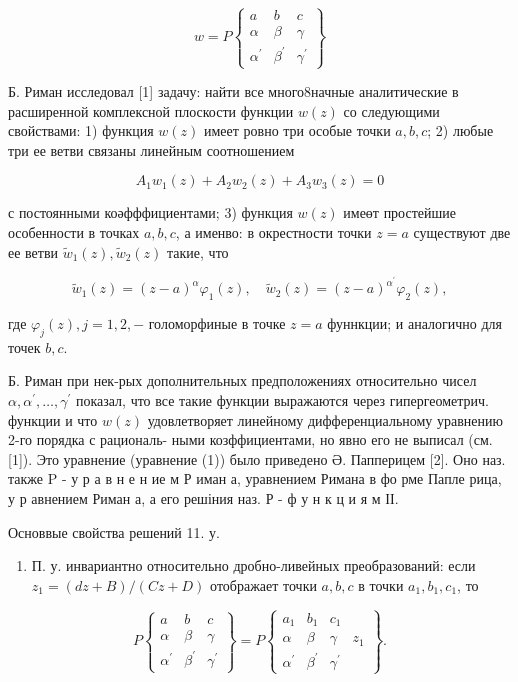 \documentclass[10pt]{article}
\begin{document}
\[
w=P\left\{\begin{array}{lll}
a & b & c \\
\alpha & \beta & \gamma \\
\alpha^{\prime} & \beta^{\prime} & \gamma^{\prime}
\end{array}\right\}
\]

Б. Риман исследовал [1] задачу: найти все много8начные аналитические в расширенной комплексной плоскости функции $w(z)$ со следующими свойствами: 1) функция $w(z)$ имеет ровно три особые точки $a, b, c$; 2) любые три ее ветви связаны линейным соотношением

\[
A_{1} w_{1}(z)+A_{2} w_{2}(z)+A_{3} w_{3}(z)=0
\]

с постоянными коәфффициентами; 3) функция $w(z)$ имеөт простейшие особенности в точках $a, b, c$, а именво: в окрестности точки $z=a$ существуют две ее ветви $\tilde{w}_{1}(z), \tilde{w}_{2}(z)$ такие, что

\[
\tilde{w}_{1}(z)=(z-a)^{\alpha} \varphi_{1}(z), \quad \tilde{w}_{2}(z)=(z-a)^{\alpha^{\prime}} \varphi_{2}(z),
\]

где $\varphi_{j}(z), j=1,2,-$ голоморфиные в точке $z=a$ фуннкции; и аналогично для точек $b, c$.

Б. Риман при нек-рых дополнительных предположениях относительно чисел $\alpha, \alpha^{\prime}, \ldots, \gamma^{\prime}$ показал, что все такие функции выражаются через гипергеометрич. функции и что $w(z)$ удовлетворяет линейному дифференциальному уравнению 2-го порядка с рациональ- ными козффициентами, но явно его не выписал (см. [1]). Это уравнение (уравнение (1)) было приведено Ə. Папперицем [2]. Оно наз. также $\mathrm{P}$ - у р а в н е н ие м Р иман а, уравнением Римана в фо рме Папле рица, у р авнением Риман а, а его решіния наз. Р - ф у н к ц и я м ІІ.

Основвые свойства решений 11. у.

\begin{enumerate}
  \item П. у. инвариантно относительно дробно-ливейных преобразований: если $z_{1}=(d z+B) /(C z+D)$ отображает точки $a, b, c$ в точки $a_{1}, b_{1}, c_{1}$, то
\end{enumerate}

\[
P\left\{\begin{array}{lll}
a & b & c \\
\alpha & \beta & \gamma \\
\alpha^{\prime} & \beta^{\prime} & \gamma^{\prime}
\end{array}\right\}=P\left\{\begin{array}{llll}
a_{1} & b_{1} & c_{1} \\
\alpha & \beta & \gamma & z_{1} \\
\alpha^{\prime} & \beta^{\prime} & \gamma^{\prime}
\end{array}\right\} .
\]
\end{document}
